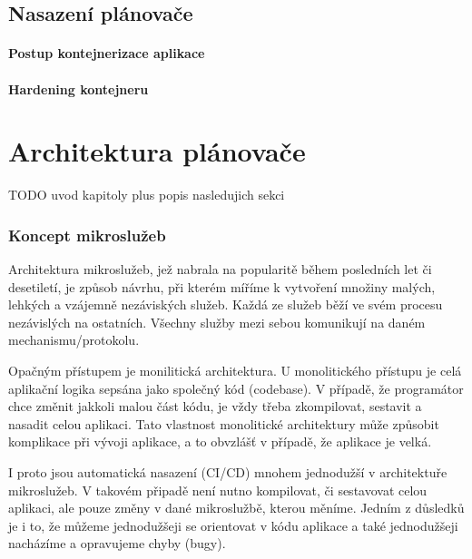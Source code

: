 \documentclass[thesis=M,czech]{FITthesis}[2019/12/23]
\theoremstyle{plain}
\theoremstyle{definition}
\begin{document}
\section{Nasazení plánovače}

\subsubsection{Postup kontejnerizace aplikace}


\subsubsection{Hardening kontejneru}


\chapter{Architektura plánovače}

TODO uvod kapitoly plus popis nasledujich sekci




\subsection{Koncept mikroslužeb}

Architektura mikroslužeb, jež nabrala na popularitě během posledních let či desetiletí, je způsob návrhu, při kterém míříme k vytvoření množiny malých, lehkých a vzájemně nezáviských služeb. Každá ze služeb běží ve svém procesu nezávislých na ostatních. Všechny služby mezi sebou komunikují na daném mechanismu/protokolu.

Opačným přístupem je monilitická architektura. U monolitického přístupu je celá aplikační logika sepsána jako společný kód (codebase). V případě, že programátor chce změnit jakkoli malou část kódu, je vždy třeba zkompilovat, sestavit a nasadit celou aplikaci. Tato vlastnost monolitické architektury může způsobit komplikace při vývoji aplikace, a to obvzlášť v případě, že aplikace je velká.

I proto jsou automatická nasazení (CI/CD) mnohem jednodužší v architektuře mikroslužeb. V takovém připadě není nutno kompilovat, či sestavovat celou aplikaci, ale pouze změny v dané mikroslužbě, kterou měníme. Jedním z důsledků je i to, že můžeme jednodužšeji se orientovat v kódu aplikace a také jednodužšeji nacházíme a opravujeme chyby (bugy).
\end{document}
